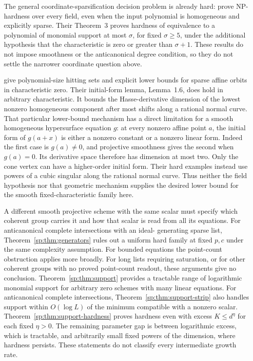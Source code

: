 The general coordinate-sparsification decision problem is already
hard: \citet[Theorem~1]{sp-bdss} prove NP-hardness over every field,
even when the input polynomial is homogeneous and explicitly sparse.
Their Theorem~3 proves hardness of equivalence to a polynomial of
monomial support at most $\sigma$, for fixed $\sigma\geq5$, under
the additional hypothesis that the characteristic is zero or greater
than $\sigma+1$. These results do not impose smoothness or the
anticanonical degree condition, so they do not settle the narrower
coordinate question above.

\citet[Theorems~1.2 and~1.5]{sp-bs-orbits} give polynomial-size
hitting sets and explicit lower bounds for sparse affine orbits in
characteristic zero. Their initial-form lemma, Lemma~1.6, does hold
in arbitrary characteristic. It bounds the Hasse-derivative dimension
of the lowest nonzero homogeneous component after most shifts along
a rational normal curve. That particular lower-bound mechanism has
a direct limitation for a smooth homogeneous hypersurface equation
$g$: at every nonzero affine point $a$, the initial form of $g(a+x)$
is either a nonzero constant or a nonzero linear form. Indeed the
first case is $g(a)\ne0$, and projective smoothness gives the second
when $g(a)=0$. Its derivative space therefore has dimension at most
two. Only the cone vertex can have a higher-order initial form.
Their hard examples instead use powers of a cubic singular along
the rational normal curve. Thus neither the field hypothesis nor
that geometric mechanism supplies the desired lower bound for the
smooth fixed-characteristic family here.

A different smooth projective scheme with the same scalar must specify
which coherent group carries it and how that scalar is read from all
its equations. For anticanonical complete intersections with an ideal-
generating sparse list, Theorem~\ref{sp:thm:generators} rules out a
uniform hard family at fixed $p,c$ under the same complexity assumption.
For bounded equations the point-count obstruction applies more broadly.
For long lists requiring saturation, or for other coherent groups with
no proved point-count readout, these arguments give no conclusion.
Theorem~\ref{sp:thm:support} provides a tractable range of logarithmic
monomial support for arbitrary zero schemes with many linear equations.
For anticanonical complete intersections,
Theorem~\ref{sp:thm:support-strip} also handles support within
$O(\log L)$ of the minimum compatible with a nonzero scalar.
Theorem~\ref{sp:thm:support-hardness} proves hardness even with excess
$K\leq d^\eta$ for each fixed $\eta>0$. The remaining parameter gap
is between logarithmic excess, which is tractable, and arbitrarily
small fixed powers of the dimension, where hardness persists.
These statements do not classify every intermediate growth rate.
